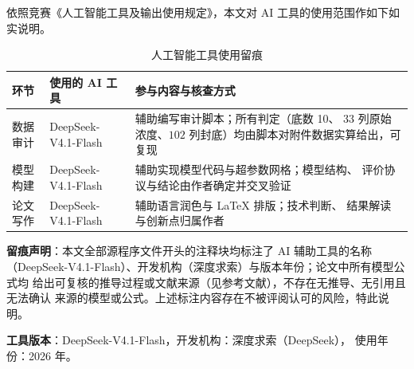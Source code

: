 依照竞赛《人工智能工具及输出使用规定》，本文对 AI 工具的使用范围作如下如实说明。

\begin{table}[H]
\centering
\caption{人工智能工具使用留痕}
\label{tab:ai}
\small
\begin{fittable}
\begin{tabular}{@{}p{}p{}p{}@{}}
\toprule
环节 & 使用的 AI 工具 & 参与内容与核查方式 \\
\midrule
数据审计 & DeepSeek-V4.1-Flash & 辅助编写审计脚本；所有判定（底数 10、
$33$ 列原始浓度、$102$ 列封底）均由脚本对附件数据实算给出，可复现 \\
模型构建 & DeepSeek-V4.1-Flash & 辅助实现模型代码与超参数网格；模型结构、
评价协议与结论由作者确定并交叉验证 \\
论文写作 & DeepSeek-V4.1-Flash & 辅助语言润色与 LaTeX 排版；技术判断、
结果解读与创新点归属作者 \\
\bottomrule
\end{tabular}
\end{fittable}
\end{table}

\textbf{留痕声明}：本文全部源程序文件开头的注释块均标注了 AI 辅助工具的名称
（DeepSeek-V4.1-Flash）、开发机构（深度求索）与版本年份；论文中所有模型公式均
给出可复核的推导过程或文献来源（见参考文献），不存在无推导、无引用且无法确认
来源的模型或公式。上述标注内容存在不被评阅认可的风险，特此说明。

\textbf{工具版本}：DeepSeek-V4.1-Flash，开发机构：深度求索（DeepSeek），
使用年份：2026 年。
